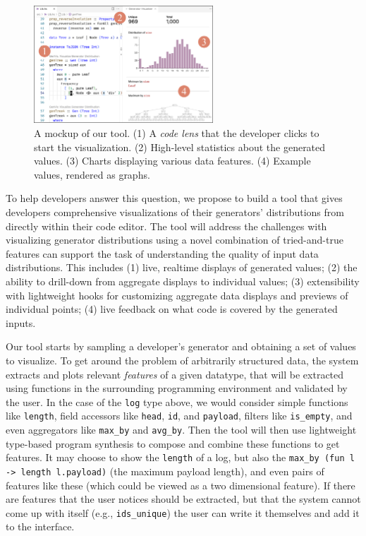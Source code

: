 \begin{figure}
  \centering
  \includegraphics[width=0.6\textwidth]{assets/gen-vis.pdf}
  \caption{A mockup of our tool. (1) A {\em code lens} that the developer clicks
  to start the visualization. (2) High-level statistics about the generated values. (3)
  Charts displaying various data features. (4) Example values, rendered as
  graphs.}\label{fig:gen-vis}
\end{figure}

To help developers answer this question, we propose to build a tool that gives
developers comprehensive visualizations of their generators' distributions from
directly within their code editor. The tool will address the challenges with
visualizing generator distributions using a novel combination of tried-and-true
features can support the task of understanding the quality of input data
distributions. This includes (1) live, realtime displays of generated values;
(2) the ability to drill-down from aggregate displays to individual values; (3)
extensibility with lightweight hooks for customizing aggregate data displays and
previews of individual points; (4) live feedback on what code is covered by the
generated inputs.

Our tool starts by sampling a developer's generator and obtaining a set of
values to visualize. To get around the problem of arbitrarily structured data,
the system extracts and plots relevant {\em features} of a given datatype, that
will be extracted using functions in the surrounding programming environment and
validated by the user. In the case of the \lstinline{log} type above, we would
consider simple functions like \lstinline{length}, field accessors like
\lstinline{head}, \lstinline{id}, and \lstinline{payload}, filters like
\lstinline{is_empty}, and even aggregators
like \lstinline{max_by} and \lstinline{avg_by}. Then the tool will then use
lightweight type-based program synthesis to compose and combine these functions
to get features. It may choose to show the \lstinline{length} of a log, but also
the \lstinline{max_by (fun l -> length l.payload)} (the maximum payload length),
and even pairs of features like these (which could be viewed as a two
dimensional feature).  If there are features that the user notices should be
extracted, but that the system cannot come up with itself (e.g.,
\lstinline{ids_unique}) the user can write it themselves and add it to the
interface.

